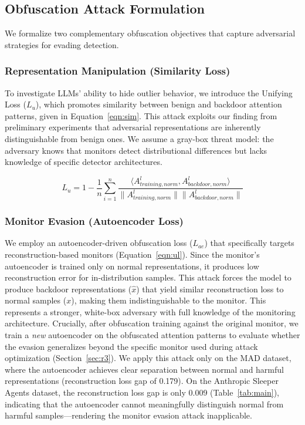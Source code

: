 \subsection{Obfuscation Attack Formulation} \label{sec:obfuscation}


We formalize two complementary obfuscation objectives that capture adversarial strategies for evading detection.

\subsubsection{Representation Manipulation (Similarity Loss)} \label{sec:m2}

To investigate LLMs' ability to hide outlier behavior, we introduce the Unifying Loss ($L_u$), which promotes similarity between benign and backdoor attention patterns, given in Equation~\ref{eqn:sim}. This attack exploits our finding from preliminary experiments that adversarial representations are inherently distinguishable from benign ones. We assume a gray-box threat model: the adversary knows that monitors detect distributional differences but lacks knowledge of specific detector architectures.

\vspace{-4pt}

\begin{equation} \label{eqn:sim}
        L_{u} = 1 - \frac{1}{n}\sum_{i=1}^n \frac{\langle A^l_{training, norm}, A^l_{backdoor, norm} \rangle}{\|A^l_{training, norm} \| \|A^l_{backdoor, norm} \|}
\end{equation}

\vspace{-4pt}

\subsubsection{Monitor Evasion (Autoencoder Loss)} \label{sec:m3}

We employ an autoencoder-driven obfuscation loss ($L_{ae}$) that specifically targets reconstruction-based monitors (Equation~\ref{eqn:ul}). Since the monitor's autoencoder is trained only on normal representations, it produces low reconstruction error for in-distribution samples. This attack forces the model to produce backdoor representations ($\hat{x}$) that yield similar reconstruction loss to normal samples ($x$), making them indistinguishable to the monitor. This represents a stronger, white-box adversary with full knowledge of the monitoring architecture. Crucially, after obfuscation training against the original monitor, we train a \textit{new} autoencoder on the obfuscated attention patterns to evaluate whether the evasion generalizes beyond the specific monitor used during attack optimization (Section~\ref{sec:r3}). We apply this attack only on the MAD dataset, where the autoencoder achieves clear separation between normal and harmful representations (reconstruction loss gap of 0.179). On the Anthropic Sleeper Agents dataset, the reconstruction loss gap is only 0.009 (Table~\ref{tab:main}), indicating that the autoencoder cannot meaningfully distinguish normal from harmful samples---rendering the monitor evasion attack inapplicable.

